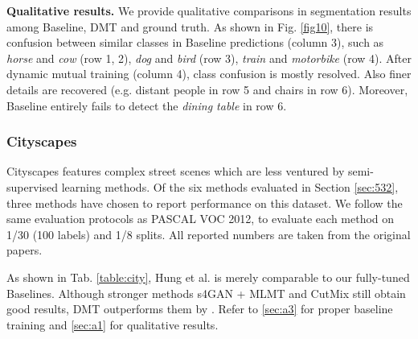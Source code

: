 \documentclass[preprint,review,10pt]{elsarticle}
\begin{document}
\textbf{Qualitative results.} We provide qualitative comparisons in segmentation results among Baseline, DMT and ground truth. As shown in Fig. \ref{fig10}, there is confusion between similar classes in Baseline predictions (column 3), such as \textit{horse} and \textit{cow} (row 1, 2), \textit{dog} and \textit{bird} (row 3), \textit{train} and \textit{motorbike} (row 4). After dynamic mutual training (column 4), class confusion is mostly resolved. Also finer details are recovered (e.g. distant people in row 5 and chairs in row 6). Moreover, Baseline entirely fails to detect the \textit{dining table} in row 6.

\subsubsection{Cityscapes}
\label{sec:533}

Cityscapes features complex street scenes which are less ventured by semi-supervised learning methods. Of the six methods evaluated in Section \ref{sec:532}, three methods have chosen to report performance on this dataset. We follow the same evaluation protocols as PASCAL VOC 2012, to evaluate each method on 1/30 (100 labels) and 1/8 splits. All reported numbers are taken from the original papers.

As shown in Tab. \ref{table:city}, Hung et al. \cite{hung} is merely comparable to our fully-tuned Baselines. Although stronger methods s4GAN + MLMT \cite{mittal2019semi} and CutMix \cite{french2019semisupervised} still obtain good results, DMT outperforms them by . Refer to \ref{sec:a3} for proper baseline training and \ref{sec:a1} for qualitative results.







\begin{table}[t]
\caption{Mean IoU () results for DMT and other methods on Cityscapes \textit{val} set. Performance gap to Oracle is shown in brackets. \textit{* ImageNet pre-training.}}
\label{table:city}
\centering
{}
\end{table}
\end{document}
